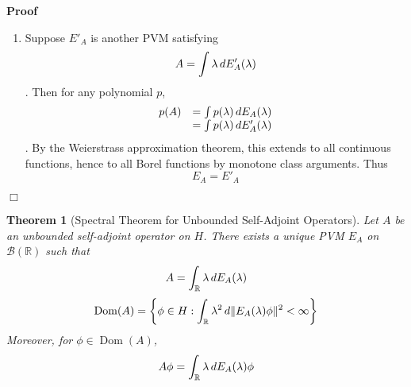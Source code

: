 \documentclass{article}
\newcommand{\tmop}[1]{\ensuremath{\operatorname{#1}}}
\newcommand{\tmtextbf}[1]{\text{{\bfseries{#1}}}}
\newenvironment{enumeratenumeric}{\begin{enumerate}[1.] }{\end{enumerate}}
\newenvironment{proof}{\noindent\textbf{Proof\ }}{\hspace*{\fill}$\Box$\medskip}
\newtheorem{theorem}{Theorem}
\newcommand{\R}{\mathbb{R}}
\newcommand{\1}{\mathbbm{1}}
\newcommand{\Dom}{\tmop{Dom}}
\begin{document}
\begin{proof}
\begin{enumeratenumeric}
    \item \tmtextbf{Uniqueness.} Suppose $E'_A$ is another PVM satisfying
    \begin{equation}
      A = \int \lambda \hspace{0.17em} dE'_A (\lambda)
    \end{equation}
    . Then for any polynomial $p$,
    \begin{equation}
      \begin{array}{ll}
        p (A) & = \int p (\lambda)  \hspace{0.17em} dE_A (\lambda)\\
        & = \int p (\lambda)  \hspace{0.17em} dE'_A (\lambda)
      \end{array}
    \end{equation}
    . By the Weierstrass approximation theorem, this extends to all continuous
    functions, hence to all Borel functions by monotone class arguments. Thus
    \begin{equation}
      E_A = E'_A
    \end{equation}
  \end{enumeratenumeric}
\end{proof}

\begin{theorem}
  [Spectral Theorem for Unbounded Self-Adjoint
  Operators]\label{thm:spectral_unbounded} Let $A$ be an unbounded
  self-adjoint operator on $H$. There exists a unique PVM $E_A$ on
  $\mathcal{B} (\R)$ such that
  \begin{equation}
    A = \int_{\R} \lambda \hspace{0.17em} dE_A (\lambda)
  \end{equation}
  \begin{equation}
    \Dom (A) = \left\{ \phi \in H : \int_{\R} \lambda^2  \hspace{0.17em}
    d\|E_A (\lambda) \phi \|^2 < \infty \right\}
  \end{equation}
  Moreover, for $\phi \in \Dom (A)$,
  \begin{equation}
    A \phi = \int_{\R} \lambda \hspace{0.17em} dE_A (\lambda) \phi
  \end{equation}
\end{theorem}
\end{document}
